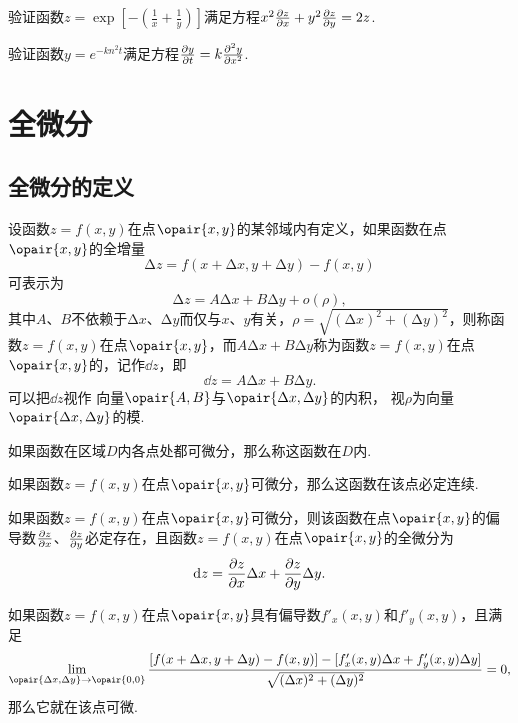 \begin{example}
验证函数\(z = \exp[-\left(\frac{1}{x}+\frac{1}{y}\right)]\)满足方程\(x^2 \pdv{z}{x} + y^2 \pdv{z}{y} = 2z\).
\end{example}

\begin{example}
验证函数\(y = e^{-k n^2 t}\)满足方程\(\pdv{y}{t} = k \pdv[2]{y}{x}\).
\end{example}

\section{全微分}
\subsection{全微分的定义}
\begin{definition}
设函数\(z=f(x,y)\)在点\(\opair{x,y}\)的某邻域内有定义，如果函数在点\(\opair{x,y}\)的全增量\[
\increment z = f(x+\increment x,y+\increment y)-f(x,y)
\]可表示为\[
\increment z = A \increment x + B \increment y + o(\rho),
\]其中\(A\)、\(B\)不依赖于\(\increment x\)、\(\increment y\)而仅与\(x\)、\(y\)有关，\(\rho=\sqrt{(\increment x)^2+(\increment y)^2}\)，则称函数\(z=f(x,y)\)在点\(\opair{x,y}\)，而\(A \increment x + B \increment y\)称为函数\(z=f(x,y)\)在点\(\opair{x,y}\)的，记作\(\dd{z}\)，即\[
\dd{z} = A \increment x + B \increment y.
\]可以把\(\dd{z}\)视作%
向量\(\opair{A,B}\)与\(\opair{\increment x,\increment y}\)的内积，%
视\(\rho\)为向量\(\opair{\increment x,\increment y}\)的模.

如果函数在区域\(D\)内各点处都可微分，那么称这函数在\(D\)内.
\end{definition}

\begin{theorem}
如果函数\(z=f(x,y)\)在点\(\opair{x,y}\)可微分，那么这函数在该点必定连续.
\end{theorem}

\begin{theorem}[必要条件]\label{theorem:多元函数微分法.二元函数可微的必要条件}
如果函数\(z=f(x,y)\)在点\(\opair{x,y}\)可微分，则该函数在点\(\opair{x,y}\)的偏导数\(\pdv{z}{x}\)、\(\pdv{z}{y}\)必定存在，且函数\(z=f(x,y)\)在点\(\opair{x,y}\)的全微分为\[
\dd{z} = \pdv{z}{x} \Delta x + \pdv{z}{y} \Delta y.
\]
\end{theorem}

\begin{corollary}
如果函数\(z=f(x,y)\)在点\(\opair{x,y}\)具有偏导数\(f'_x(x,y)\)和\(f'_y(x,y)\)，且满足\[
\lim\limits_{\opair{\increment x,\increment y}\to\opair{0,0}}
 \frac{[f(x+\increment x,y+\increment y)-f(x,y)]-[f'_x(x,y) \increment x + f'_y(x,y) \increment y]}{\sqrt{(\increment x)^2+(\increment y)^2}} = 0,
\]那么它就在该点可微.
\end{corollary}

